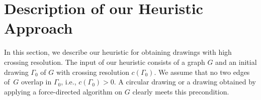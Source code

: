 \documentclass[runningheads]{llncs}
\begin{document}
%
%
%
%



\section{Description of our Heuristic Approach}
\label{sec:algorithm}

In this section, we describe our heuristic for obtaining drawings with high crossing resolution. The input of our heuristic consists of a graph $G$ and an initial drawing $\Gamma_0$ of $G$ with crossing resolution $c(\Gamma_0)$. We assume that no two edges of~$G$ overlap in $\Gamma_0$, i.e., $c(\Gamma_0)>0$. A circular drawing or a drawing obtained by applying a force-directed algorithm on $G$ clearly meets this precondition.
\end{document}
